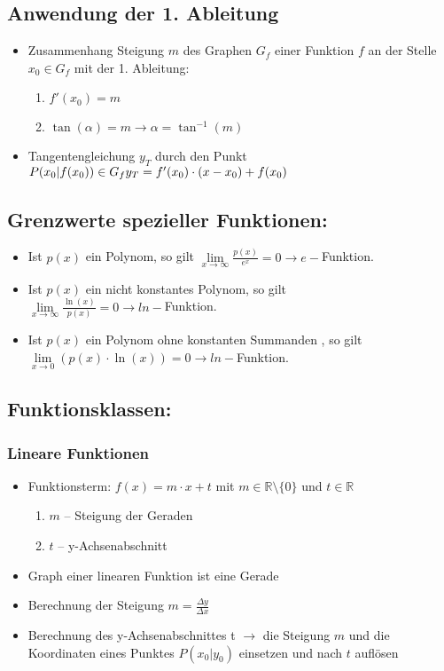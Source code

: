 \documentclass[a4paper,twocolumn,10pt]{onepgnote1}
\begin{document}
\subsection{Anwendung der 1. Ableitung}
\begin{itemize}
\item Zusammenhang Steigung $m$ des Graphen $G_f$ einer Funktion $f$ an der Stelle $x_0 \in G_f$ mit der 1. Ableitung:\\
\begin{enumerate}
\item $f'(x_0) = m$\\
\item $\tan{(\alpha)} = m \longrightarrow \alpha = \tan^{-1}{(m)}$
\end{enumerate}
\item Tangentengleichung $y_T$ durch den Punkt $P(x_0|f(x_0)) \in G_f \\y_T = f'(x_0)\cdot(x-x_0) + f(x_0) $
\end{itemize}
\subsection{Grenzwerte spezieller Funktionen:}
\begin{itemize}
\item Ist $p(x)$ ein Polynom, so gilt $\lim \limits_{x\longrightarrow \infty} \frac{p(x)}{e^x} = 0 \longrightarrow e-$Funktion.
\item Ist $p(x)$ ein nicht konstantes Polynom, so gilt \\$\lim \limits_{x\longrightarrow \infty} \frac{\ln(x)}{p(x)} = 0 \longrightarrow ln-$Funktion.
\item Ist $p(x)$ ein Polynom ohne konstanten Summanden , so gilt \\$\lim \limits_{x\longrightarrow 0} (p(x)\cdot \ln(x)) = 0\longrightarrow ln-$Funktion.
\end{itemize}
\subsection{Funktionsklassen:}
\subsubsection{Lineare Funktionen} 
\begin{itemize}
\item Funktionsterm: $f(x) = m\cdot x +t$ mit $m\in \mathds{R}\setminus\{0\}$ und $t\in \mathds{R}$ 
  \begin{enumerate}
  \item $m$ – Steigung der Geraden
  \item $t$ – y-Achsenabschnitt
  \end{enumerate}
  \item Graph einer linearen Funktion ist eine Gerade 
  \item Berechnung der Steigung $ m=\frac{\Delta y}{\Delta x}$
  \item Berechnung des y-Achsenabschnittes t $\longrightarrow$ die Steigung $m$ und die Koordinaten eines Punktes $P(x_0|y_0)$ einsetzen und nach $t$ auflösen
\end{itemize}
\end{document}
